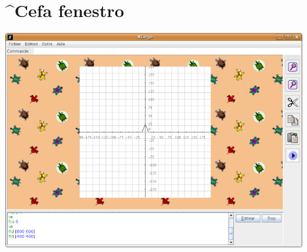 \section{^Cefa fenestro}
\begin{center}
\includegraphics[scale=0.45]{bildoj/Capture.png} 
\end{center}
